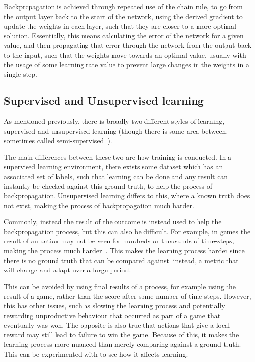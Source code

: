 Backpropagation is achieved through repeated use of the chain rule, to go from
the output layer back to the start of the network, using the derived gradient to
update the weights in each layer, such that they are closer to a more optimal
solution. Essentially, this means calculating the error of the network for a
given value, and then propagating that error through the network from the output
back to the input, such that the weights move towards an optimal value, usually
with the usage of some learning rate value to prevent large changes in the
weights in a single step.

\subsection{Supervised and Unsupervised learning}

As mentioned previously, there is broadly two different styles of learning,
supervised and unsupervised learning (though there is some area between,
sometimes called semi-supervised~\cite{chapelle2009semi}).

The main differences between these two are how training is conducted. In a
supervised learning environment, there exists some dataset which has an
associated set of labels, such that learning can be done and any result can
instantly be checked against this ground truth, to help the process of
backpropagation. Unsupervised learning differs to this, where a known truth does
not exist, making the process of backpropagation much harder.

Commonly, instead the result of the outcome is instead used to help the
backpropagation process, but this can also be difficult. For example, in games
the result of an action may not be seen for hundreds or thousands of time-steps,
making the process much harder~\cite{sutton1984temporal}. This makes the
learning process harder since there is no ground truth that can be compared
against, instead, a metric that will change and adapt over a large period.

This can be avoided by using final results of a process, for example using the
result of a game, rather than the score after some number of time-steps.
However, this has other issues, such as slowing the learning process and
potentially rewarding unproductive behaviour that occurred as part of a game
that eventually was won. The opposite is also true that actions that give a
local reward may still lead to failure to win the game. Because of this, it
makes the learning process more nuanced than merely comparing against a ground
truth. This can be experimented with to see how it affects learning.

